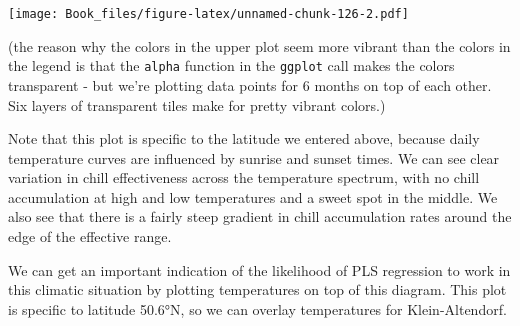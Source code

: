 \documentclass[
]{book}
\begin{document}
\texttt{[image: Book\_files/figure-latex/unnamed-chunk-126-2.pdf]}

(the reason why the colors in the upper plot seem more vibrant than the colors in the legend is that the \texttt{alpha} function in the \texttt{ggplot} call makes the colors transparent - but we're plotting data points for 6 months on top of each other. Six layers of transparent tiles make for pretty vibrant colors.)

Note that this plot is specific to the latitude we entered above, because daily temperature curves are influenced by sunrise and sunset times. We can see clear variation in chill effectiveness across the temperature spectrum, with no chill accumulation at high and low temperatures and a sweet spot in the middle. We also see that there is a fairly steep gradient in chill accumulation rates around the edge of the effective range.

We can get an important indication of the likelihood of PLS regression to work in this climatic situation by plotting temperatures on top of this diagram. This plot is specific to latitude 50.6°N, so we can overlay temperatures for Klein-Altendorf.
\end{document}
